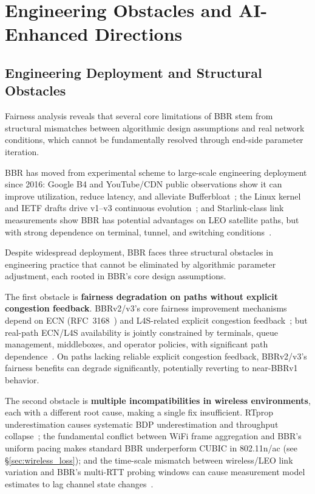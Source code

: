 \documentclass[a4paper,fleqn]{cas-sc}
\begin{document}
\FloatBarrier

\section{Engineering Obstacles and AI-Enhanced Directions}
\label{sec:deployment}

\subsection{Engineering Deployment and Structural Obstacles}
\label{sec:engineering}

Fairness analysis reveals that several core limitations of BBR stem from
structural mismatches between algorithmic design assumptions and real network
conditions, which cannot be fundamentally resolved through end-side parameter
iteration.

BBR has moved from experimental scheme to large-scale engineering deployment since
2016: Google B4 and YouTube/CDN public observations show it can improve
utilization, reduce latency, and alleviate
Bufferbloat~\citep{cardwell2017bbr}; the Linux kernel and IETF drafts drive v1--v3
continuous evolution~\citep{cardwell2017bbr,cardwell2019bbrv2,ietf_ccwg_bbr,abrol2026bbr};
and Starlink-class link measurements show BBR has potential advantages on LEO
satellite paths, but with strong dependence on terminal, tunnel, and switching
conditions~\citep{deutschmann2023starlink,kamel2024starquic}.

Despite widespread deployment, BBR faces three structural obstacles in engineering
practice that cannot be eliminated by algorithmic parameter adjustment, each rooted
in BBR's core design assumptions.

The first obstacle is \textbf{fairness degradation on paths without explicit
congestion feedback}. BBRv2/v3's core fairness improvement mechanisms depend on
ECN (RFC~3168~\citep{rfc3168}) and L4S-related explicit congestion
feedback~\citep{rfc9330,rfc9331,rfc9332}; but real-path ECN/L4S availability is
jointly constrained by terminals, queue management, middleboxes, and operator
policies, with significant path dependence~\citep{abrol2026bbr,zeynali2024bbrv3}.
On paths lacking reliable explicit congestion feedback, BBRv2/v3's fairness
benefits can degrade significantly, potentially reverting to near-BBRv1 behavior.

The second obstacle is \textbf{multiple incompatibilities in wireless environments},
each with a different root cause, making a single fix insufficient. RTprop
underestimation causes systematic BDP underestimation and throughput
collapse~\citep{abrol2026bbr}; the fundamental conflict between WiFi frame
aggregation and BBR's uniform pacing makes standard BBR underperform CUBIC in
802.11n/ac (see \S\ref{sec:wireless_loss}); and the time-scale mismatch between
wireless/LEO link variation and BBR's multi-RTT probing windows can cause
measurement model estimates to lag channel state changes~\citep{wang2024bbr_leo,kamel2024starquic,laniewski2024road}.
\end{document}
